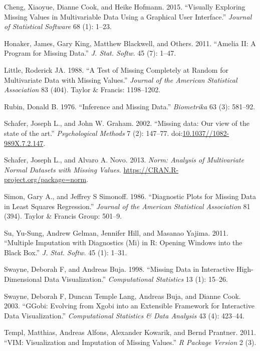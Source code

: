 \documentclass[]{article}
\begin{document}
\hypertarget{ref-cheng2015}{}
Cheng, Xiaoyue, Dianne Cook, and Heike Hofmann. 2015. ``Visually
Exploring Missing Values in Multivariable Data Using a Graphical User
Interface.'' \emph{Journal of Statistical Software} 68 (1): 1--23.

\hypertarget{ref-Amelia}{}
Honaker, James, Gary King, Matthew Blackwell, and Others. 2011. ``Amelia
II: A Program for Missing Data.'' \emph{J. Stat. Softw.} 45 (7): 1--47.

\hypertarget{ref-Little1988}{}
Little, Roderick JA. 1988. ``A Test of Missing Completely at Random for
Multivariate Data with Missing Values.'' \emph{Journal of the American
Statistical Association} 83 (404). Taylor \& Francis: 1198--1202.

\hypertarget{ref-Rubin1976}{}
Rubin, Donald B. 1976. ``Inference and Missing Data.'' \emph{Biometrika}
63 (3): 581--92.

\hypertarget{ref-Schafer2002}{}
Schafer, Joseph L., and John W. Graham. 2002. ``Missing data: Our view
of the state of the art.'' \emph{Psychological Methods} 7 (2): 147--77.
doi:\href{https://doi.org/10.1037//1082-989X.7.2.147}{10.1037//1082-989X.7.2.147}.

\hypertarget{ref-norm}{}
Schafer, Joseph L., and Alvaro A. Novo. 2013. \emph{Norm: Analysis of
Multivariate Normal Datasets with Missing Values}.
\url{https://CRAN.R-project.org/package=norm}.

\hypertarget{ref-simon-simonoff}{}
Simon, Gary A., and Jeffrey S Simonoff. 1986. ``Diagnostic Plots for
Missing Data in Least Squares Regression.'' \emph{Journal of the
American Statistical Association} 81 (394). Taylor \& Francis Group:
501--9.

\hypertarget{ref-mi}{}
Su, Yu-Sung, Andrew Gelman, Jennifer Hill, and Masanao Yajima. 2011.
``Multiple Imputation with Diagnostics (Mi) in R: Opening Windows into
the Black Box.'' \emph{J. Stat. Softw.} 45 (1): 1--31.

\hypertarget{ref-Swayne1998}{}
Swayne, Deborah F, and Andreas Buja. 1998. ``Missing Data in Interactive
High-Dimensional Data Visualization.'' \emph{Computational Statistics}
13 (1): 15--26.

\hypertarget{ref-swayne2003ggobi}{}
Swayne, Deborah F, Duncan Temple Lang, Andreas Buja, and Dianne Cook.
2003. ``GGobi: Evolving from Xgobi into an Extensible Framework for
Interactive Data Visualization.'' \emph{Computational Statistics \& Data
Analysis} 43 (4): 423--44.

\hypertarget{ref-vim}{}
Templ, Matthias, Andreas Alfons, Alexander Kowarik, and Bernd Prantner.
2011. ``VIM: Visualization and Imputation of Missing Values.'' \emph{R
Package Version} 2 (3).
\end{document}
